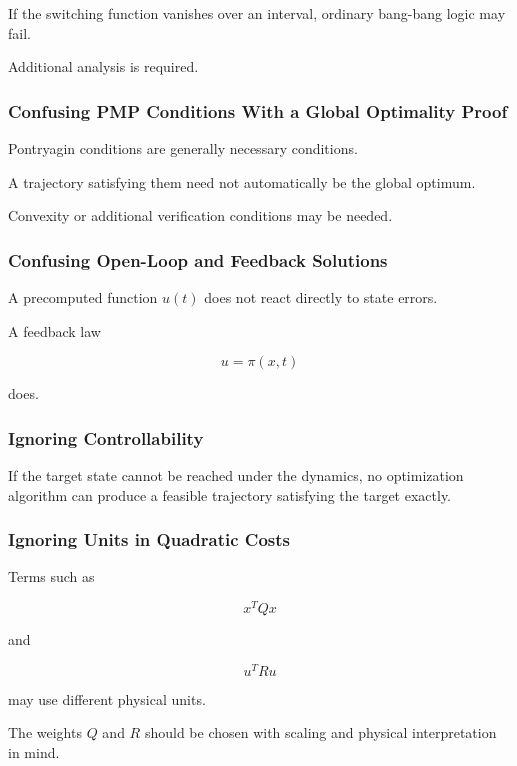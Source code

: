 If the switching function vanishes over an interval, ordinary bang-bang
logic may fail.

Additional analysis is required.

\subsubsection{Confusing PMP Conditions With a Global Optimality Proof}

Pontryagin conditions are generally necessary conditions.

A trajectory satisfying them need not automatically be the global optimum.

Convexity or additional verification conditions may be needed.

\subsubsection{Confusing Open-Loop and Feedback Solutions}

A precomputed function \(u(t)\) does not react directly to state errors.

A feedback law

\[
u=\pi(x,t)
\]

does.

\subsubsection{Ignoring Controllability}

If the target state cannot be reached under the dynamics, no optimization
algorithm can produce a feasible trajectory satisfying the target exactly.

\subsubsection{Ignoring Units in Quadratic Costs}

Terms such as

\[
x^TQx
\]

and

\[
u^TRu
\]

may use different physical units.

The weights \(Q\) and \(R\) should be chosen with scaling and physical
interpretation in mind.


